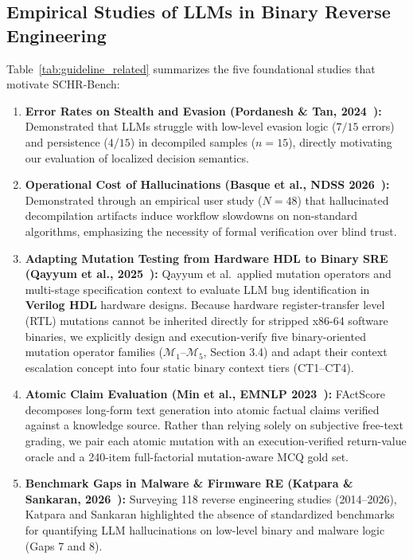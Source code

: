 \documentclass[runningheads]{llncs}
\begin{document}
\subsection{Empirical Studies of LLMs in Binary Reverse Engineering}
Table~\ref{tab:guideline_related} summarizes the five foundational studies that motivate SCHR-Bench:
\begin{enumerate}
    \item \textbf{Error Rates on Stealth and Evasion (Pordanesh \& Tan, 2024~\cite{pordanesh2024exploring}):} Demonstrated that LLMs struggle with low-level evasion logic ($7/15$ errors) and persistence ($4/15$) in decompiled samples ($n=15$), directly motivating our evaluation of localized decision semantics.
    \item \textbf{Operational Cost of Hallucinations (Basque et al., NDSS 2026~\cite{basque2026decompiling}):} Demonstrated through an empirical user study ($N=48$) that hallucinated decompilation artifacts induce workflow slowdowns on non-standard algorithms, emphasizing the necessity of formal verification over blind trust.
    \item \textbf{Adapting Mutation Testing from Hardware HDL to Binary SRE (Qayyum et al., 2025~\cite{qayyum2025verilog}):} Qayyum et al.\ applied mutation operators and multi-stage specification context to evaluate LLM bug identification in \textbf{Verilog HDL} hardware designs. Because hardware register-transfer level (RTL) mutations cannot be inherited directly for stripped x86-64 software binaries, we explicitly design and execution-verify five binary-oriented mutation operator families ($\mathcal{M}_1$--$\mathcal{M}_5$, Section 3.4) and adapt their context escalation concept into four static binary context tiers (CT1--CT4).
    \item \textbf{Atomic Claim Evaluation (Min et al., EMNLP 2023~\cite{min2023factscore}):} FActScore decomposes long-form text generation into atomic factual claims verified against a knowledge source. Rather than relying solely on subjective free-text grading, we pair each atomic mutation with an execution-verified return-value oracle and a 240-item full-factorial mutation-aware MCQ gold set.
    \item \textbf{Benchmark Gaps in Malware \& Firmware RE (Katpara \& Sankaran, 2026~\cite{katpara2026firmware}):} Surveying 118 reverse engineering studies (2014--2026), Katpara and Sankaran highlighted the absence of standardized benchmarks for quantifying LLM hallucinations on low-level binary and malware logic (Gaps 7 and 8).
\end{enumerate}
\end{document}
